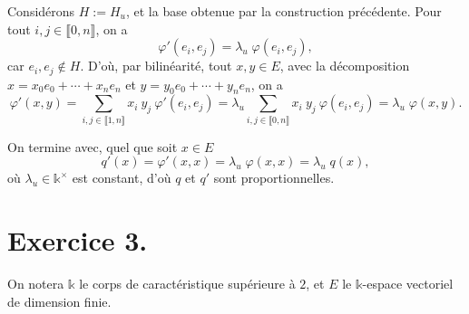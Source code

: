 \documentclass{../../td}
\begin{document}
\begin{enumerate}
      Considérons $H := H_u$, et la base obtenue par la construction précédente.
      Pour tout $i,j \in \llbracket 0,n\rrbracket$, on a \[
      \varphi'(e_i, e_j) = \lambda_u\; \varphi(e_i, e_j)
      ,\] car $e_i, e_j \not\in H$.
      D'où, par bilinéarité, tout $x, y \in E$, avec la décomposition $x = x_0 e_0 + \cdots + x_n e_n$ et $y = y_0 e_0 + \cdots + y_n e_n$, on a {
        \small
      \[
      \varphi'(x, y) = \sum_{i,j \in \llbracket 1,n\rrbracket  } x_i\: y_j\:\varphi'(e_i, e_j) = \lambda_u \sum_{i,j \in \llbracket 0,n\rrbracket} x_i\:y_j\: \varphi(e_i, e_j) =\lambda_u\; \varphi(x, y)
      .\]
      }

      On termine avec, quel que soit $x \in E$ \[
      q'(x) = \varphi'(x,x) = \lambda_u\; \varphi(x,x) = \lambda_u \; q(x)
      ,\] 
      où $\lambda_u \in \mathds{k}^\times$ est constant,
      d'où $q$ et $q'$ sont proportionnelles.
  \end{enumerate}

  \chapter*{Exercice 3.}

  On notera $\mathds{k}$ le corps de caractéristique supérieure à $2$, et $E$ le $\mathds{k}$-espace vectoriel de dimension finie.
\end{document}
